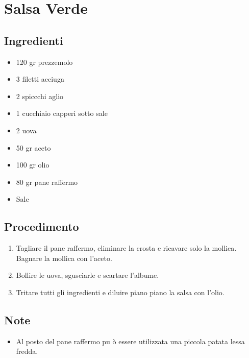 \section{Salsa Verde}
\subsection{Ingredienti}
\begin{itemize}
\item 120 gr prezzemolo  
\item 3 filetti acciuga   
\item 2 spiccchi aglio  
\item 1 cucchiaio capperi sotto sale  
\item 2 uova  
\item 50 gr aceto  
\item 100 gr olio  
\item 80 gr pane raffermo  
\item Sale
\end{itemize}
\subsection{Procedimento}
\begin{enumerate}
\item  Tagliare il pane raffermo, eliminare la crosta e ricavare solo la mollica. Bagnare la mollica con l'aceto.  
\item  Bollire le uova, sgusciarle e scartare l'albume.  
\item  Tritare tutti gli ingredienti e diluire piano piano la salsa con l'olio.
\end{enumerate}
\subsection{Note}
\begin{itemize}
\item Al posto del pane raffermo pu ò essere utilizzata una piccola patata lessa fredda.
\end{itemize}
